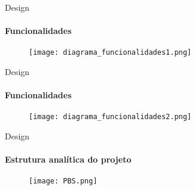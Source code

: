 \begin{frame}[t]{Design}
    \framesubtitle{Funcionalidades}
    \begin{figure}
        \texttt{[image: diagrama\_funcionalidades1.png]}
    \end{figure}
\end{frame}
\begin{frame}[t]{Design}
    \framesubtitle{Funcionalidades}
    \begin{figure}
        \texttt{[image: diagrama\_funcionalidades2.png]}
    \end{figure}
\end{frame}

\begin{frame}[t]{Design}
    \framesubtitle{Estrutura analítica do projeto}
    \begin{figure}
        \texttt{[image: PBS.png]}
    \end{figure}
\end{frame}